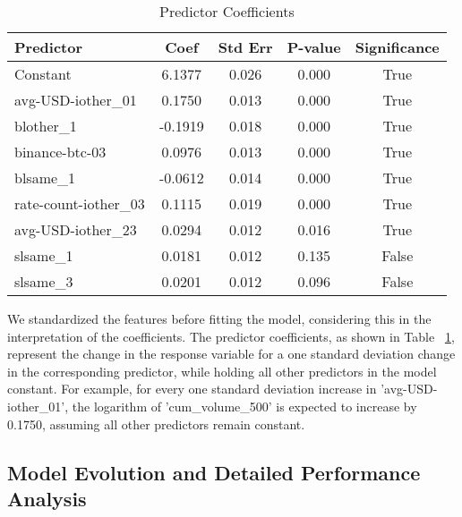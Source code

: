 \documentclass{article}
\begin{document}
\begin{table}[htbp]
  \centering
  \begin{tabular}{|l|c|c|c|c|}
  \hline
  \textbf{Predictor}        & \textbf{Coef} & \textbf{Std Err} & \textbf{P-value} & \textbf{Significance} \\
  \hline
  Constant                  & 6.1377        & 0.026            & 0.000            & True                  \\
  avg-USD-iother\_01       & 0.1750        & 0.013            & 0.000            & True                  \\
  blother\_1               & -0.1919       & 0.018            & 0.000            & True                  \\
  binance-btc-03          & 0.0976        & 0.013            & 0.000            & True                  \\
  blsame\_1                & -0.0612       & 0.014            & 0.000            & True                  \\
  rate-count-iother\_03    & 0.1115        & 0.019            & 0.000            & True                  \\
  avg-USD-iother\_23       & 0.0294        & 0.012            & 0.016            & True                  \\
  slsame\_1                & 0.0181        & 0.012            & 0.135            & False                 \\
  slsame\_3                & 0.0201        & 0.012            & 0.096            & False                 \\
  \hline
  \end{tabular}
  \caption{Predictor Coefficients}
  \label{tab:predictor-coefficients}
\end{table}

We standardized the features before fitting the model, considering this in the interpretation of the coefficients. The predictor coefficients, as shown in Table ~\ref{tab:predictor-coefficients}, represent the change in the response variable for a one standard deviation change in the corresponding predictor, while holding all other predictors in the model constant. For example, for every one standard deviation increase in 'avg-USD-iother\_01', the logarithm of 'cum\_volume\_500' is expected to increase by 0.1750, assuming all other predictors remain constant.

\subsection{Model Evolution and Detailed Performance Analysis}
\end{document}

